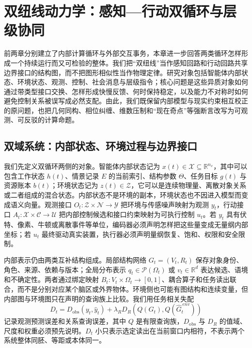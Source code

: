 \chapter{双纽线动力学：感知—行动双循环与层级协同}
\label{chp:lemniscate_ch}

前两章分别建立了内部计算循环与外部交互事务，本章进一步回答两类循环怎样形成一个持续运行而又可检验的整体。我们把“双纽线”当作感知回路和行动回路共享边界接口的结构图，而不把图形相似性当作物理定律。研究对象包括智能体内部状态、环境状态、观测、控制、社会消息与层级指令；核心问题是这些异质对象如何通过带类型接口交换、怎样形成快慢反馈、何时保持稳定，以及能力不对称时如何避免控制关系被误写成必然支配。由此，我们既保留内部模型与现实约束相互校正的原问题，也把几何同构、相位纠缠、维数压制和“现在奇点”等强断言改写为可观测、可反驳的计算命题。

\section{双域系统：内部状态、环境过程与边界接口}
\label{sec:section_2656}

我们先定义双循环两侧的对象。智能体内部状态记为 $x(t)\in\mathcal{X}\subseteq\mathbb{R}^{n_x}$，其中可以包含工作状态 $h(t)$、情景记录 $E$ 的当前索引、结构参数 $\Theta$、任务目标 $g(t)$ 与资源账本 $b(t)$；环境状态记为 $z(t)\in\mathcal{Z}$，它可以是连续物理量、离散对象关系或二者组成的混合状态。内部状态不是环境的副本，环境状态也不因进入模型而变成语义向量。观测接口 $O_t:\mathcal{Z}\times\mathcal{N}\rightarrow\mathcal{Y}$ 把环境与传感噪声映射为观测 $y_t$，行动接口 $A_t:\mathcal{X}\times\mathcal{C}\rightarrow\mathcal{U}$ 把内部控制候选和接口约束映射为可执行控制 $u_t$。若 $y_t$ 具有伏特、像素、牛顿或离散事件等单位，编码器必须声明怎样把这些量变成无量纲内部坐标；若 $u_t$ 最终驱动真实装置，执行器必须声明量纲恢复、饱和、权限和安全限制。

内部表示仍由两类互补结构组成。局部结构网络 $G_t=(V_t,R_t)$ 保存对象身份、角色、来源、依赖与版本；全局分布表示 $q_t\in\mathcal{P}(\Omega_t)$ 或 $v_t\in\mathbb{R}^{d}$ 表达候选、语境和不确定性。两者通过绑定映射 $B_t:V_t\times\Omega_t\rightarrow[0,1]$、耦合算子和任务读出联合，而不是分别对应某个脑区或外界物体。环境侧也可能有图结构和连续变量，但内部图与环境图只在声明的查询族上比较。我们用任务相关失配
\[
D_t=D_{\mathrm{obs}}\!\left(y_t,\widehat y_t\right)+\lambda_R D_R\!\left(Q(G_t),Q(\widehat G_t^{\,env})\right)
\]
记录观测预测误差和关系查询误差，其中 $Q$ 是有限查询族，$D_{\mathrm{obs}}$ 与 $D_R$ 的值域、尺度和权重必须预先说明。$D_t$ 小只表示选定读出在当前窗口内相符，不表示两个系统整体同胚、等距或本体同一。

